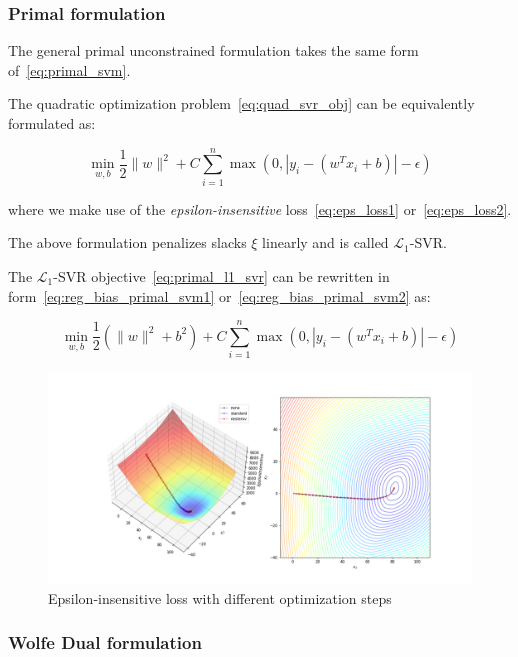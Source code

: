 \subsubsection{Primal formulation}

The general primal unconstrained formulation takes the same form of~\eqref{eq:primal_svm}.

The quadratic optimization problem~\eqref{eq:quad_svr_obj} can be equivalently formulated as:

\begin{equation} \label{eq:primal_l1_svr}
	\min_{w,b} \frac{1}{2} \| w \|^2 + C \sum_{i=1}^n \max(0, |y_i - (w^T x_i + b)| - \epsilon)
\end{equation}

where we make use of the \emph{epsilon-insensitive} loss~\eqref{eq:eps_loss1} or~\eqref{eq:eps_loss2}.

The above formulation penalizes slacks $\xi$ linearly and is called $\mathcal{L}_1$-SVR.

The $\mathcal{L}_1$-SVR objective~\eqref{eq:primal_l1_svr} can be rewritten in form~\eqref{eq:reg_bias_primal_svm1} or~\eqref{eq:reg_bias_primal_svm2} as:

\begin{equation} \label{eq:reg_bias_primal_l1_svr}
	\min_{w,b} \frac{1}{2} (\| w \|^2 + b^2) + C \sum_{i=1}^n \max(0, |y_i - (w^T x_i + b)| - \epsilon)
\end{equation}

\begin{figure}[h!]
	\centering
  	\includegraphics[scale=0.4]{img/l1_svr_loss}
  	\caption{Epsilon-insensitive loss with different optimization steps}
  	\label{fig:l1_svr_loss}
\end{figure}

\subsubsection{Wolfe Dual formulation}

